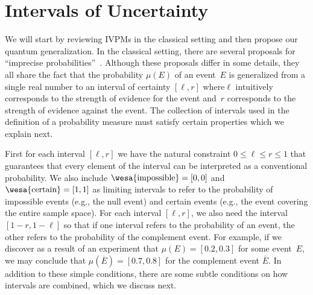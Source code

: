 \documentclass[english,reprint, aps, prl,superscriptaddress, showpacs,
showkeys, longbibliography, amsmath, amssymb]{revtex4-1}
\theoremstyle{plain}
\theoremstyle{definition}
\newcommand{\imposs}{{\text{\wesa{impossible}}}}
\newcommand{\necess}{{\text{\wesa{certain}}}}
\newcommand{\nb}{\nolinebreak[1] }
\begin{document}
\section{Intervals of Uncertainty}
  \label{sec:Interval-Uncertainty}
We will start by reviewing IVPMs in the classical setting and then
propose our quantum generalization. In the classical setting, there
are several proposals for ``imprecise
probabilities''~\citep{Dempster1967,Shafer1976,GilboaSchmeidler1994,Marinacci1999,Weichselberger2000,JamisonLodwick2004,HuberRonchetti2009,Grabisch2016}.
Although these proposals differ in some details, they all share the
fact that the probability $\mu(E)$ of an event~$E$ is generalized from
a single real number to an interval of certainty $[\ell,r]$
where\nb$\ell$ intuitively corresponds to the strength of evidence for
the event and~$r$ corresponds to the strength of evidence against the
event. The collection of intervals used in the definition of a
probability measure must satisfy certain properties which we explain
next.

First for each interval $[\ell,r]$ we have the natural constraint
$0 \leq \ell \leq r \leq 1$ that guarantees that every element of the
interval can be interpreted as a conventional probability. We also
include $\imposs=[0,0]$ and $\necess=[1,1]$ as limiting intervals to
refer to the probability of impossible events (e.g., the null event)
and certain events (e.g., the event covering the entire sample space).
For each interval $[\ell,r]$, we also need the interval
$[1-r,1-\ell]$ so that if one interval refers to the probability of an
event, the other refers to the probability of the complement
event. For example, if we discover as a result of an experiment that
$\mu(E) = [0.2,0.3]$ for some event~$E$, we may conclude that
$\mu(\overline{E}) = [0.7,0.8]$ for the complement event
$\overline{E}$. In addition to these simple conditions, there are some
subtle conditions on how intervals are combined, which we discuss
next.
\end{document}
